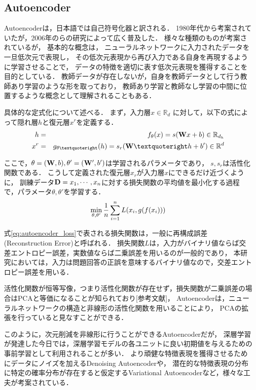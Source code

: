 \subsection{Autoencoder}
Autoencoderは，日本語では自己符号化器と訳される．
1980年代から考案されていたが，2006年の\cite{hinton2006reducing}らの研究によって広く普及した．
様々な種類のものが考案されているが，
基本的な概念は，
ニューラルネットワークに入力されたデータを一旦低次元で表現し，
その低次元表現から再び入力である自身を再現するように学習させることで，
データの特徴を適切に表す低次元表現を獲得することを目的としている．
教師データが存在しないが，自身を教師データとして行う教師あり学習のような形を取っており，
教師あり学習と教師なし学習の中間に位置するような概念として理解されることもある．


具体的な定式化について述べる．
まず，入力層$x \in \mathbb{R}_d$
に対して，以下の式によって隠れ層$h$と復元層$x^r$を定義する．
\begin{eqnarray} 
\label{eq:autoencoder_hidden}
h &=& f_\theta(x) = s({\bf W} x + b)\in\mathbb R_{d_h}
\\
\label{eq:autoencoder_reconstruct}
x^r &=& g_{\theta’}(h) = s_r({\bf W’} h + b')\in\mathbb R^d
\end{eqnarray} 

ここで，$\theta=({\bf W}, b), \theta'=({\bf W'}, b')$は学習されるパラメータであり，
$s, s_r$は活性化関数である．
こうして定義された復元層$x_r$が入力層$x$にできるだけ近づくように，
訓練データ${\bf D} = x_1, \cdots, x_n$に対する損失関数の平均値を最小化する過程で，パラメータ$\theta, \theta'$を学習する．
\begin{equation}
\label{eq:autoencoder_loss}
{\min_{\theta, \theta'} {1\over n}\sum_{i=1}^n L(x_i, g(f(x_i)))}
\end{equation}

式\ref{eq:autoencoder_loss}で表される損失関数は，一般に再構成誤差(Reconstruction Error)と呼ばれる．
損失関数$L$は，入力がバイナリ値ならば交差エントロピー誤差，実数値ならば二乗誤差を用いるのが一般的であり，%
本研究においては，入力は問題回答の正誤を意味するバイナリ値なので，交差エントロピー誤差を用いる．

活性化関数が恒等写像，つまり活性化関数が存在せず，損失関数が二乗誤差の場合はPCAと等価になることが知られており[参考文献]，
Autoencoderは，ニューラルネットワークの構造と非線形の活性化関数を用いることにより，
PCAの拡張を行っていると見なすことができる．

このように，次元削減を非線形に行うことができるAutoencoderだが，
深層学習が発達した今日では，深層学習モデルの各ユニットに良い初期値を与えるための事前学習として利用されることが多い\cite{erhan2010does}．
より頑健な特徴表現を獲得させるためにデータにノイズを加えるDenoising Autoencoder\cite{vincent2008extracting}や，
潜在的な特徴表現の分布に特定の確率分布が存在すると仮定するVariational Autoencoder\cite{kingma2014semi}など，様々な工夫が考案されている．



